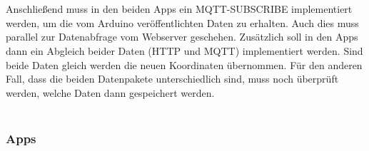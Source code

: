 \\
\\
Anschließend muss in den beiden Apps ein MQTT-SUBSCRIBE implementiert werden, um die vom Arduino veröffentlichten Daten zu erhalten. Auch dies muss parallel zur Datenabfrage vom Webserver geschehen. Zusätzlich soll in den Apps dann ein Abgleich beider Daten (HTTP und MQTT) implementiert werden. Sind beide Daten gleich werden die neuen Koordinaten übernommen. Für den anderen Fall, dass die beiden Datenpakete unterschiedlich sind, muss noch überprüft werden, welche Daten dann gespeichert werden. 
\\
\\
\subsubsection{Apps} 

